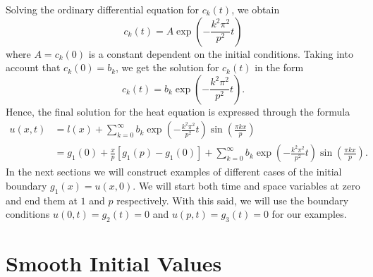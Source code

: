 \documentclass[00main.tex]{subfiles}
\begin{document}
Solving the ordinary differential equation for $c_k (t)$, we obtain %
\[ c_k(t) = A \exp \left( - \frac{k^2 \pi^2}{p^2}t \right)\] where $A = c_k(0)$ is a constant dependent on the initial conditions. Taking into account that $c_k(0) = b_k$, we get the solution for $c_k(t)$ in the form \[ c_k (t) = b_k \exp \left( - \frac{k^2 \pi^2}{p^2} t \right). \] Hence, the final solution for the heat equation is expressed through the formula \begin{align*}
u(x,t) &= l(x) + \sum_{k=0}^\infty b_k \exp \left( - \frac{k^2 \pi^2}{p^2} t \right) \sin \left( \frac{\pi kx}{p} \right) \\
 &= g_1(0) + \frac{x}{p}\left[ g_1(p) - g_1(0) \right]  + \sum_{k=0}^\infty b_k \exp \left( - \frac{k^2 \pi^2}{p^2} t \right) \sin \left( \frac{\pi kx}{p} \right).
\end{align*} In the next sections we will construct examples of different cases of the initial boundary $g_1(x) = u(x,0)$. We will start both time and space variables at zero and end them at $1$ and $p$ respectively. With this said, we will use the boundary conditions $u(0,t) = g_2 (t)=0$ and $u(p,t)= g_3(t) = 0$ for our examples.


\section{Smooth Initial Values}
\end{document}
